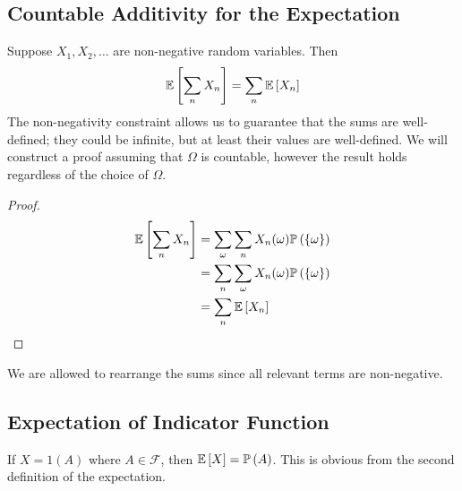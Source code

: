 \subsection{Countable Additivity for the Expectation}
Suppose \(X_1, X_2, \dots\) are non-negative random variables. Then
\[ \mathbb{E}\left[{\sum_n X_n}\right] = \sum_n \mathbb{E}\left[{X_n}\right] \]
The non-negativity constraint allows us to guarantee that the sums are well-defined; they could be infinite, but at least their values are well-defined. We will construct a proof assuming that \(\Omega\) is countable, however the result holds regardless of the choice of \(\Omega\).
\begin{proof}
	\begin{align*}
		\mathbb{E}\left[{\sum_n X_n}\right] & = \sum_\omega \sum_n X_n(\omega) \mathbb{P}\left({\{ \omega \}}\right) \\
		                    & = \sum_n \sum_\omega X_n(\omega) \mathbb{P}\left({\{ \omega \}}\right) \\
		                    & = \sum_n \mathbb{E}\left[{X_n}\right]
	\end{align*}
\end{proof}
\noindent We are allowed to rearrange the sums since all relevant terms are non-negative.

\subsection{Expectation of Indicator Function}
If \(X = 1(A)\) where \(A \in \mathcal F\), then \(\mathbb{E}\left[{X}\right] = \mathbb{P}\left({A}\right)\). This is obvious from the second definition of the expectation.

